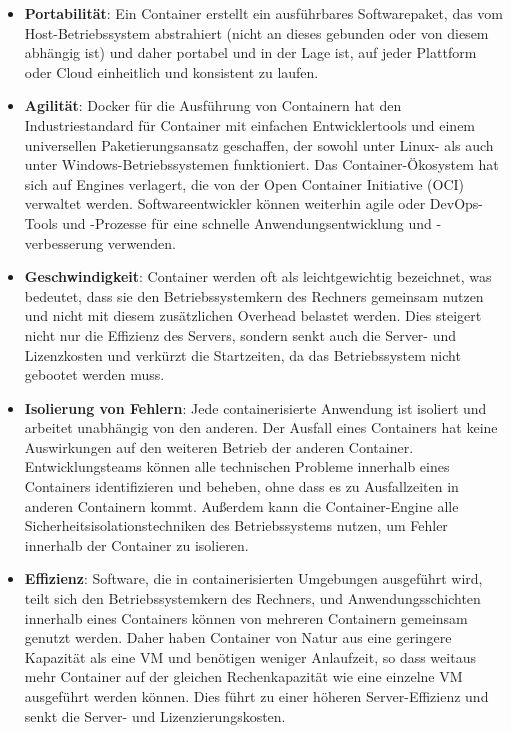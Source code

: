 \begin{itemize}
    \setlength\itemsep{1em}
    \item[] \textbf{Portabilität}: Ein Container erstellt ein ausführbares
    Softwarepaket, das vom Host-Betriebssystem abstrahiert
    (nicht an dieses gebunden oder von diesem abhängig ist)
    und daher portabel und in der Lage ist, auf jeder Plattform oder
    Cloud einheitlich und konsistent zu laufen.

    \item[] \textbf{Agilität}: Docker für die Ausführung von Containern hat den
    Industriestandard für Container mit einfachen Entwicklertools
    und einem universellen Paketierungsansatz geschaffen, der sowohl
    unter Linux- als auch unter Windows-Betriebssystemen funktioniert.
    Das Container-\"Okosystem hat sich auf Engines verlagert, die von
    der Open Container Initiative (OCI) verwaltet werden.
    Softwareentwickler können weiterhin agile oder DevOps-Tools
    und -Prozesse für eine schnelle Anwendungsentwicklung und
    -verbesserung verwenden.

    \item[] \textbf{Geschwindigkeit}: Container werden oft als leichtgewichtig
    bezeichnet, was bedeutet, dass sie den Betriebssystemkern des
    Rechners gemeinsam nutzen und nicht mit diesem zusätzlichen
    Overhead belastet werden. Dies steigert nicht nur die Effizienz
    des Servers, sondern senkt auch die Server- und Lizenzkosten und
    verkürzt die Startzeiten, da das Betriebssystem nicht gebootet
    werden muss.

    \item[] \textbf{Isolierung von Fehlern}: Jede containerisierte Anwendung ist
    isoliert und arbeitet unabhängig von den anderen. Der Ausfall
    eines Containers hat keine Auswirkungen auf den weiteren Betrieb
    der anderen Container. Entwicklungsteams können alle technischen
    Probleme innerhalb eines Containers identifizieren und beheben,
    ohne dass es zu Ausfallzeiten in anderen Containern kommt.
    Außerdem kann die Container-Engine alle
    Sicherheitsisolationstechniken des Betriebssystems nutzen, um Fehler innerhalb der
    Container zu isolieren.

    \item[] \textbf{Effizienz}: Software, die in containerisierten Umgebungen
    ausgeführt wird, teilt sich den Betriebssystemkern des Rechners,
    und Anwendungsschichten innerhalb eines Containers können von
    mehreren Containern gemeinsam genutzt werden. Daher haben
    Container von Natur aus eine geringere Kapazität als eine VM
    und benötigen weniger Anlaufzeit, so dass weitaus mehr Container
    auf der gleichen Rechenkapazität wie eine einzelne VM ausgeführt
    werden können. Dies führt zu einer höheren Server-Effizienz und
    senkt die Server- und Lizenzierungskosten.


\end{itemize}
